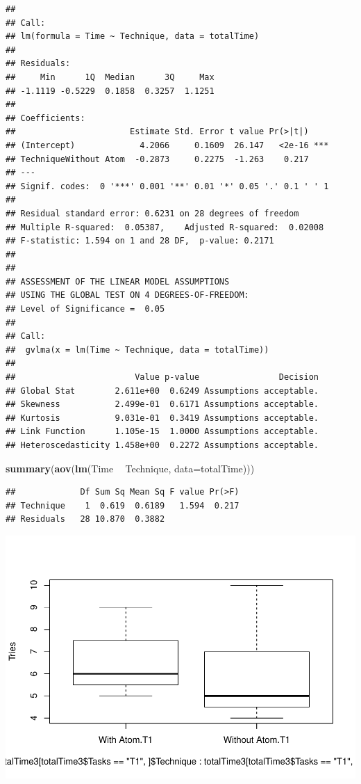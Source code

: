 \documentclass[]{article}
\newenvironment{Shaded}{\begin{snugshade}}{\end{snugshade}}
\newcommand{\DataTypeTok}[1]{\textcolor[rgb]{0.13,0.29,0.53}{#1}}
\newcommand{\KeywordTok}[1]{\textcolor[rgb]{0.13,0.29,0.53}{\textbf{#1}}}
\newcommand{\NormalTok}[1]{#1}
\newcommand{\OperatorTok}[1]{\textcolor[rgb]{0.81,0.36,0.00}{\textbf{#1}}}
\newcommand{\StringTok}[1]{\textcolor[rgb]{0.31,0.60,0.02}{#1}}
\begin{document}
\begin{verbatim}
## 
## Call:
## lm(formula = Time ~ Technique, data = totalTime)
## 
## Residuals:
##     Min      1Q  Median      3Q     Max 
## -1.1119 -0.5229  0.1858  0.3257  1.1251 
## 
## Coefficients:
##                       Estimate Std. Error t value Pr(>|t|)    
## (Intercept)             4.2066     0.1609  26.147   <2e-16 ***
## TechniqueWithout Atom  -0.2873     0.2275  -1.263    0.217    
## ---
## Signif. codes:  0 '***' 0.001 '**' 0.01 '*' 0.05 '.' 0.1 ' ' 1
## 
## Residual standard error: 0.6231 on 28 degrees of freedom
## Multiple R-squared:  0.05387,    Adjusted R-squared:  0.02008 
## F-statistic: 1.594 on 1 and 28 DF,  p-value: 0.2171
## 
## 
## ASSESSMENT OF THE LINEAR MODEL ASSUMPTIONS
## USING THE GLOBAL TEST ON 4 DEGREES-OF-FREEDOM:
## Level of Significance =  0.05 
## 
## Call:
##  gvlma(x = lm(Time ~ Technique, data = totalTime)) 
## 
##                        Value p-value                Decision
## Global Stat        2.611e+00  0.6249 Assumptions acceptable.
## Skewness           2.499e-01  0.6171 Assumptions acceptable.
## Kurtosis           9.031e-01  0.3419 Assumptions acceptable.
## Link Function      1.105e-15  1.0000 Assumptions acceptable.
## Heteroscedasticity 1.458e+00  0.2272 Assumptions acceptable.
\end{verbatim}

\begin{Shaded}
\begin{Highlighting}[]
\KeywordTok{summary}\NormalTok{(}\KeywordTok{aov}\NormalTok{(}\KeywordTok{lm}\NormalTok{(Time }\OperatorTok{~}\StringTok{ }\NormalTok{Technique, }\DataTypeTok{data=}\NormalTok{totalTime)))}
\end{Highlighting}
\end{Shaded}

\begin{verbatim}
##             Df Sum Sq Mean Sq F value Pr(>F)
## Technique    1  0.619  0.6189   1.594  0.217
## Residuals   28 10.870  0.3882
\end{verbatim}

\includegraphics{main_files/figure-latex/unnamed-chunk-19-1.pdf}
\end{document}
